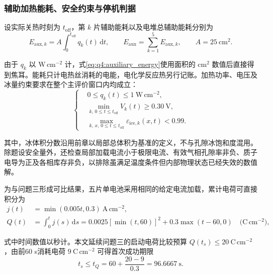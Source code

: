 \documentclass[bwprint]{gmcmthesis}
\numberwithin{figure}{section}
\begin{document}
\subsubsection{辅助加热能耗、安全约束与停机判据}

设实际关热时刻为 $t_{\mathrm{off}}$，第 $k$ 片辅助能耗以及电堆总辅助能耗分别为
\begin{equation}
E_{\mathrm{aux},k}=A\int_0^{t_{\mathrm{off}}}q_k(t)\,\mathrm dt,
\qquad E_{\mathrm{aux}}=\sum_{k=1}^{5}E_{\mathrm{aux},k},
\qquad A=25\ \mathrm{cm^2}.
\tag{7-27}\label{eq:q4:auxiliary_energy}
\end{equation}

由于 $q_k$ 以 $\mathrm{W\,cm^{-2}}$ 计，式\eqref{eq:q4:auxiliary_energy}使用面积的 $\mathrm{cm^2}$ 数值后直接得到焦耳。能耗只计电热丝消耗的电能，电化学反应热另行记账。加热功率、电压及冰量约束要求在整个主评价窗口内均成立：
\begin{equation}
\left\{\begin{aligned}
&0\leq q_k(t)\leq1\ \mathrm{W\,cm^{-2}},\\
&\min_{k,\,0\leq t\leq t_{\mathrm{off}}}V_k(t)\geq0.30\ \mathrm V,\\
&\max_{k,\,x,\,0\leq t\leq t_{\mathrm{off}}}\varepsilon_{\mathrm{ice},k}(x,t)<0.99.
\end{aligned}\right.
\tag{7-28}\label{eq:q4:path_constraints}
\end{equation}

其中，冰体积分数沿用前章以局部总体积为基准的定义，不与孔隙冰饱和度混用。除题设安全量外，还检查局部加载电流小于极限电流、有效气相孔隙率非负、质子电导为正及各相库存非负，以排除虽满足温度条件但内部物理状态已经失效的数值解。

为与问题三形成可比结果，五片单电池采用相同的给定电流加载，累计电荷可直接积分为
\begin{equation}
\begin{aligned}
j(t)&=\min(0.005t,0.3)\ \mathrm{A\,cm^{-2}},\\
Q(t)&=\int_0^tj(s)\,\mathrm ds
=0.0025[\min(t,60)]^2+0.3\max(t-60,0)
\quad\big(\mathrm{C\,cm^{-2}}\big),
\end{aligned}
\tag{7-29}\label{eq:q4:load_charge}
\end{equation}

式中时间数值以秒计。本文延续问题三的启动电荷比较预算 $Q(t_s)\leq20\ \mathrm{C\,cm^{-2}}$，由前60 s消耗电荷 $9\ \mathrm{C\,cm^{-2}}$ 可得首次成功期限
\begin{equation}
t_s\leq t_Q=60+\frac{20-9}{0.3}=96.6667\ \mathrm s.
\tag{7-30}\label{eq:q4:startup_deadline}
\end{equation}
\end{document}
